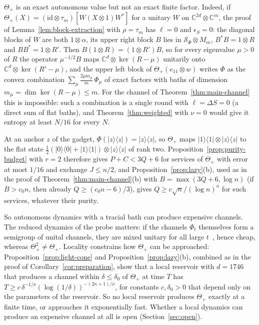 \begin{remark}\label{rem:lazy-exact}
$\Theta_+$ is an exact autonomous value but not an exact finite factor. Indeed, if $\Theta_+(X)=(\mathrm{id}\otimes\tau_m)[W(X\otimes1)W^*]$ for a unitary
$W$ on $\mathbb C^{2d}\otimes\mathbb C^m$, the proof of Lemma~\ref{lem:block-extraction} with $\rho=\tau_m$ has $\ell=0$ and $\epsilon_S=0$: the diagonal blocks of
$W$ are both $1\otimes\alpha$, its upper right block $B$ lies in $\mathcal S_\Phi\otimes M_m$, $B^*B=1\otimes R$ and $BB^*=1\otimes R'$. Then
$B(1\otimes R)=(1\otimes R')B$, so for every eigenvalue $\mu>0$ of $R$ the operator $\mu^{-1/2}B$ maps $\mathbb C^d\otimes\ker(R-\mu)$ unitarily onto
$\mathbb C^d\otimes\ker(R'-\mu)$, and the upper left block of $\Theta_+(e_{11}\otimes w)$ writes $\Phi$ as the convex combination
$\sum_\mu\frac{2\mu m_\mu}m\,\Phi_\mu$ of exact factors with baths of dimension $m_\mu=\dim\ker(R-\mu)\le m$. For the channel of
Theorem~\ref{thm:main-channel} this is impossible: such a combination is a single round with $\ell=\Delta S=0$ (a direct sum of flat baths), and
Theorem~\ref{thm:weighted} with $\nu=0$ would give it entropy at least $N/16$ for every $N$.
\end{remark}

\begin{remark}\label{rem:lazy-exchange}
At an anchor $z$ of the gadget, $\Phi(|z\rangle\langle z|)=|z\rangle\langle z|$, so $\Theta_+$ maps $|1\rangle\langle1|\otimes|z\rangle\langle z|$ to the flat state
$\frac12(|0\rangle\langle0|+|1\rangle\langle1|)\otimes|z\rangle\langle z|$ of rank two. Proposition~\ref{prop:purity-budget} with $r=2$ therefore gives $P+C<3Q+6$ for
services of $\Theta_+$ with error at most $1/16$ and exchange $J\le n/2$, and Proposition~\ref{prop:lazy}(b), used as in the proof of
Theorem~\ref{thm:main-channel}(b) with $B=\max(3Q+6,\log n)$ (if $B>c_0n$, then already $Q\ge(c_0n-6)/3$), gives $Q\ge c\sqrt n/(\log n)^\kappa$ for such services, whatever their purity.
\end{remark}

So autonomous dynamics with a tracial bath can produce expensive channels. The reduced dynamics of the probe matters: if the channels
$\Phi_t$ themselves form a semigroup of unital channels, they are mixed unitary for all large $t$~\cite{BhatDevendra2025}, hence cheap, whereas
$\Theta_+^2\ne\Theta_+$. Locality constrains how $\Theta_+$ can be approached: Proposition~\ref{prop:light-cone} and
Proposition~\ref{prop:lazy}(b), combined as in the proof of Corollary~\ref{cor:preparation}, show that a local reservoir with $d=1746$ that
produces a channel within $\delta\le\delta_0$ of $\Theta_+$ at time $T$ has $T\ge c\,\delta^{-1/\nu}(\log(1/\delta))^{-(2\kappa+1)/\nu}$, for constants
$c,\delta_0>0$ that depend only on the parameters of the reservoir. So no local reservoir produces $\Theta_+$ exactly at a finite time, or approaches
it exponentially fast. Whether a local dynamics can produce an expensive channel at all is open (Section~\ref{sec:open}).
